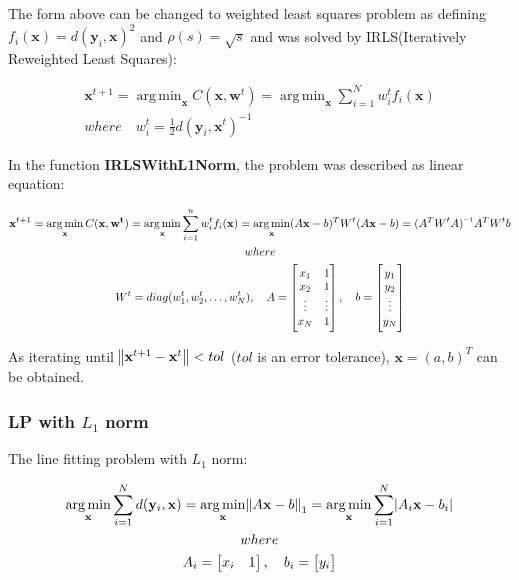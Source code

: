 \documentclass[paper=a4, fontsize=11pt]{scrartcl} %
\numberwithin{equation}{section} %
\numberwithin{figure}{section} %
\numberwithin{table}{section} %
\newcommand{\funcname}[1]{\textbf{#1}}
\newcommand{\inv}{^{\raisebox{.2ex}{$\scriptscriptstyle-1$}}}
\renewcommand{\vec}[1]{\mathbf{#1}}
\DeclareMathOperator*{\argmin}{arg\,min} %
\begin{document}
The form above can be changed to weighted least squares problem as defining $f_{i}(\vec{x}) = d(\vec{y}_{i}, \vec{x})^{2}$ and $\rho(s) = \sqrt{s}$ and was solved by IRLS(Iteratively Reweighted Least Squares):

\begin{gather*} 
\vec{x}^{t+1} = \argmin_{\vec{x}} C(\vec{x}, \vec{w}^{t}) = \argmin_{\vec{x}} \sum_{i=1}^{N}w_{i}^{t}f_{i}(\vec{x}) \\ 
where \quad w_{i}^{t} = \frac{1}{2}d(\vec{y}_{i}, \vec{x}^{t})^{-1}
\end{gather*}

In the function \funcname{IRLSWithL1Norm}, the problem was described as linear equation:

\begin{gather*} 
\vec{x}^{t+1} = \argmin_{\vec{x}} C(\vec{x}, \vec{w^{t}}) = \argmin_{\vec{x}} \sum_{i=1}^{n}w_{i}^{t}f_{i}(\vec{x}) 
	= \argmin_{\vec{x}}(A\vec{x} - b)^{T} W^{t} (A\vec{x} - b) = (A^{T}W^{t}A)\inv A^{T}W^{t}b\\
where \\
W^{t} = diag({w_{1}^{t}, w_{2}^{t}, \dots, w_{N}^{t}}), 
\quad 
A = 
\begin{bmatrix}
    x_{1}	&	1 \\
    x_{2}	&	1 \\
    \vdots	& \vdots	\\
    x_{N}	&	1
\end{bmatrix},
\quad b = 
\begin{bmatrix}
    y_{1}	\\
    y_{2}	\\
    \vdots	\\
    y_{N}
\end{bmatrix}
\end{gather*}

As iterating until $\norm{\vec{x}^{t+1} - \vec{x}^{t}} < tol$ ($tol$ is an error tolerance), $\vec{x} = (a, b)^{T}$ can be obtained.

\pagebreak

\subsubsection{LP with $L_{1}$ norm }

The line fitting problem with $L_{1}$ norm: 

\begin{gather*}
\argmin_{\vec{x}} \sum_{i=1}^{N} d(\vec{y}_{i}, \vec{x}) = \argmin_{\vec{x}} \norm{A\vec{x} - b}_{1}  = 
\argmin_{\vec{x}} \sum_{i=1}^{N} \abs{A_{i}\vec{x} - b_{i}} \\
where \\
A_{i} = 
\begin{bmatrix}
    x_{i}	&	1 
\end{bmatrix},
\quad b_{i} = 
\begin{bmatrix}
    y_{i}	
\end{bmatrix}
\end{gather*}
\end{document}
